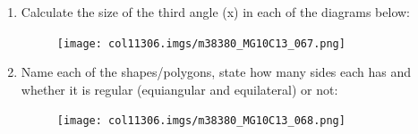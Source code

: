 \begin{enumerate}[noitemsep,
label=\textbf{\arabic*}. ]
        
\label{m38380*uid140}\item Calculate the size of the third angle (x) in each of
the diagrams below:

          
    \setcounter{subfigure}{0}


	\begin{figure}[H] %
    \begin{center}
   
\label{m38380*id401232!!!underscore!!!media}\label{
m38380*id401232!!!underscore!!!printimage}\texttt{[image: 
col11306.imgs/m38380\_MG10C13\_067.png]} %
        
    
    \end{center}

 \end{figure}   

    \addtocounter{footnote}{-0}
 \pagebreak   
        
\label{m38380*uid141}\item Name each of the shapes/polygons, state how many
sides each has and whether it is regular (equiangular and equilateral) or not:

          
    \setcounter{subfigure}{0}


	\begin{figure}[H] %
    \begin{center}
   
\label{m38380*id401233!!!underscore!!!media}\label{
m38380*id401233!!!underscore!!!printimage}\texttt{[image: 
col11306.imgs/m38380\_MG10C13\_068.png]} %
        
    
    \end{center}

 \end{figure}   

    \addtocounter{footnote}{-0}
    

\end{enumerate}
